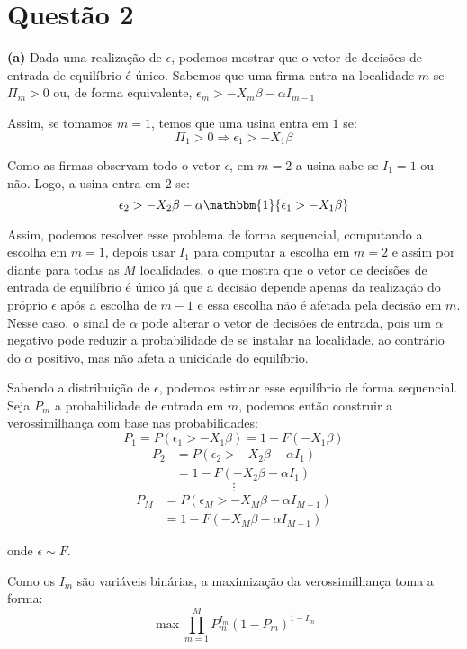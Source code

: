 \documentclass[
  12pt,
]{article}
\begin{document}
\hypertarget{questuxe3o-2}{%
\section{Questão 2}\label{questuxe3o-2}}

\textbf{(a)} Dada uma realização de \(\epsilon\), podemos mostrar que o
vetor de decisões de entrada de equilíbrio é único. Sabemos que uma
firma entra na localidade \(m\) se \(\Pi_m > 0\) ou, de forma
equivalente, \(\epsilon_m > -X_m\beta - \alpha I_{m-1}\)

Assim, se tomamos \(m=1\), temos que uma usina entra em \(1\) se: \[
\Pi_1 > 0 \Rightarrow \epsilon_1 > -X_1 \beta
\]

Como as firmas observam todo o vetor \(\epsilon\), em \(m=2\) a usina
sabe se \(I_{1} = 1\) ou não. Logo, a usina entra em \(2\) se: \[
\epsilon_2 > -X_2 \beta - \alpha\mathbbm{1}\{\epsilon_1 > -X_1 \beta\}
\]

Assim, podemos resolver esse problema de forma sequencial, computando a
escolha em \(m=1\), depois usar \(I_1\) para computar a escolha em
\(m=2\) e assim por diante para todas as \(M\) localidades, o que mostra
que o vetor de decisões de entrada de equilíbrio é único já que a
decisão depende apenas da realização do próprio \(\epsilon\) após a
escolha de \(m-1\) e essa escolha não é afetada pela decisão em \(m\).
Nesse caso, o sinal de \(\alpha\) pode alterar o vetor de decisões de
entrada, pois um \(\alpha\) negativo pode reduzir a probabilidade de se
instalar na localidade, ao contrário do \(\alpha\) positivo, mas não
afeta a unicidade do equilíbrio.

Sabendo a distribuição de \(\epsilon\), podemos estimar esse equilíbrio
de forma sequencial. Seja \(P_m\) a probabilidade de entrada em \(m\),
podemos então construir a verossimilhança com base nas probabilidades:
\[
P_1 = P(\epsilon_1 > -X_1 \beta) = 1 - F(-X_1 \beta)
\] \begin{align*}
    P_2 &= P(\epsilon_2 > -X_2 \beta - \alpha I_1) \\        
  &= 1 - F(-X_2 \beta - \alpha I_1)
\end{align*} \[
\vdots
\] \begin{align*}
    P_M &= P(\epsilon_M > -X_M \beta - \alpha I_{M-1}) \\        
  &= 1 - F(-X_M \beta - \alpha I_{M-1})
\end{align*}

onde \(\epsilon \sim F\).

Como os \(I_m\) são variáveis binárias, a maximização da verossimilhança
toma a forma: \[
\max \prod_{m=1}^{M} P_{m}^{I_{m}}\left(1-P_{m}\right)^{1-I_{m}}
\]
\end{document}
